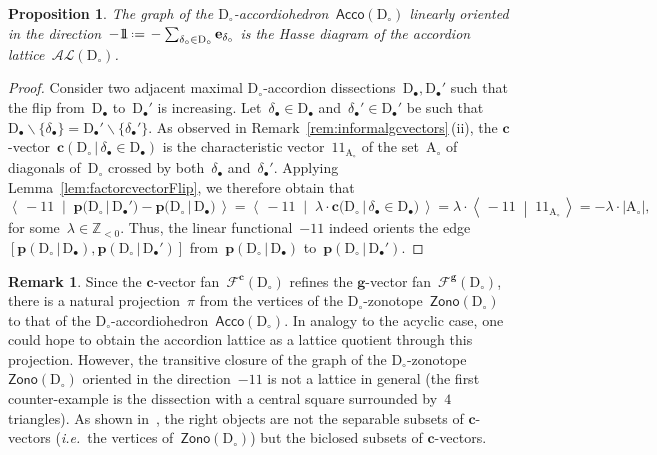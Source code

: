 \documentclass{amsart}
\newtheorem{proposition}[theorem]{Proposition}
\theoremstyle{definition}
\newtheorem{remark}[theorem]{Remark}
\newcommand{\Z}{\mathbb{Z}} %
\renewcommand{\b}[1]{\mathbf{#1}} %
\newcommand{\ssm}{\smallsetminus} %
\newcommand{\dotprod}[2]{\left\langle \, #1 \; \middle| \; #2 \, \right\rangle} %
\newcommand{\one}{{1\!\!1}} %
\newcommand{\eqdef}{\mbox{\,\raisebox{0.2ex}{\scriptsize\ensuremath{\mathrm:}}\ensuremath{=}\,}} %
\newcommand{\Acco}{\mathsf{Acco}} %
\newcommand{\Zono}{\mathsf{Zono}} %
\newcommand{\ie}{\textit{i.e.}~} %
\newcommand{\accordionLattice}{\mathcal{AL}} %
\newcommand{\dissection}{\mathrm{D}} %
\newcommand{\accordion}{\mathrm{A}} %
\newcommand{\gvectorFan}{\mathcal{F}^\mathbf{g}} %
\newcommand{\cvector}[3]{\mathbf{c}(#1  \,|\, #3 \in #2)} %
\newcommand{\bigcvector}[3]{\mathbf{c} \big( #1  \,|\, #3 \in #2 \big)} %
\newcommand{\cvectorFan}{\mathcal{F}^\mathbf{c}} %
\newcommand{\point}[2]{\mathbf{p}(#1  \,|\, #2)} %
\newcommand{\bigpoint}[2]{\mathbf{p} \big( #1  \,|\, #2 \big)} %
\newcommand{\projection}{\pi} %
\begin{document}
\begin{proposition}
The graph of the $\dissection_\circ$-accordiohedron~$\Acco(\dissection_\circ)$ linearly oriented in the direction~$-\one \eqdef - \sum_{\delta_\circ \in \dissection_\circ} \b{e}_{\delta_\circ}$ is the Hasse diagram of the accordion lattice~$\accordionLattice(\dissection_\circ)$.
\end{proposition}

\begin{proof}
Consider two adjacent maximal $\dissection_\circ$-accordion dissections~$\dissection_\bullet, \dissection_\bullet'$ such that the flip from~$\dissection_\bullet$ to~$\dissection_\bullet'$ is increasing. Let~$\delta_\bullet \in \dissection_\bullet$ and~${\delta_\bullet' \in \dissection_\bullet'}$ be such that~${\dissection_\bullet \ssm \{\delta_\bullet\} = \dissection_\bullet' \ssm \{\delta_\bullet'\}}$. As observed in Remark~\ref{rem:informalgcvectors}\,(ii), the $\b{c}$-vector~$\cvector{\dissection_\circ}{\dissection_\bullet}{\delta_\bullet}$ is the characteristic vector~$\one_{\accordion_\circ}$ of the set~$\accordion_\circ$ of diagonals of~$\dissection_\circ$ crossed by both~$\delta_\bullet$ and~$\delta_\bullet'$. Applying Lemma~\ref{lem:factorcvectorFlip}, we therefore obtain that
\[
\dotprod{-\one}{\bigpoint{\dissection_\circ}{\dissection_\bullet'} - \bigpoint{\dissection_\circ}{\dissection_\bullet}} = \dotprod{-\one}{\lambda \cdot \bigcvector{\dissection_\circ}{\dissection_\bullet}{\delta_\bullet}} = \lambda \cdot \dotprod{-\one}{\one_{\accordion_\circ}} = -\lambda \cdot |\accordion_\circ|,
\]
for some~$\lambda \in \Z_{<0}$. Thus, the linear functional~$-\one$ indeed orients the edge~$[\point{\dissection_\circ}{\dissection_\bullet}, \point{\dissection_\circ}{\dissection_\bullet'}]$ from~$\point{\dissection_\circ}{\dissection_\bullet}$ to~$\point{\dissection_\circ}{\dissection_\bullet'}$.
\end{proof}

\begin{remark}
Since the $\b{c}$-vector fan~$\cvectorFan(\dissection_\circ)$ refines the $\b{g}$-vector fan~$\gvectorFan(\dissection_\circ)$, there is a natural projection~$\projection$ from the vertices of the $\dissection_\circ$-zonotope~$\Zono(\dissection_\circ)$ to that of the $\dissection_\circ$-accordiohedron~$\Acco(\dissection_\circ)$. In analogy to the acyclic case, one could hope to obtain the accordion lattice as a lattice quotient through this projection. However, the transitive closure of the graph of the $\dissection_\circ$-zonotope~$\Zono(\dissection_\circ)$ oriented in the direction~$-\one$ is not a lattice in general (the first counter-example is the dissection with a central square surrounded by~$4$ triangles). As shown in~\cite{GarverMcConville}, the right objects are not the separable subsets of $\b{c}$-vectors (\ie the vertices of~$\Zono(\dissection_\circ)$) but the biclosed subsets of $\b{c}$-vectors.
\end{remark}
\end{document}
